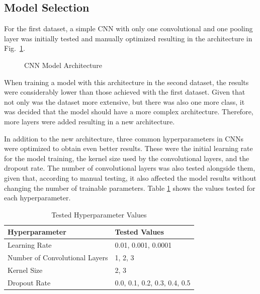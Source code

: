 \subsection{Model Selection}

For the first dataset, a simple CNN with only one convolutional and one pooling layer was initially tested and manually optimized resulting in the architecture in Fig.~\ref{fig:cnn_architecture_dataset1}.

\begin{figure}[H]
    \centering
    {\fontsize{10}{12}\selectfont}
    \caption[CNN Model Architecture]{CNN Model Architecture}
    \label{fig:cnn_architecture_dataset1}
\end{figure}

When training a model with this architecture in the second dataset, the results were considerably lower than those achieved with the first dataset. Given that not only was the dataset more extensive, but there was also one more class, it was decided that the model should have a more complex architecture. Therefore, more layers were added resulting in a new architecture.

In addition to the new architecture, three common hyperparameters in CNNs were optimized to obtain even better results. These were the initial learning rate for the model training, the kernel size used by the convolutional layers, and the dropout rate. The number of convolutional layers was also tested alongside them, given that, according to manual testing, it also affected the model results without changing the number of trainable parameters. Table \ref{table:cnn_hyperparameters} shows the values tested for each hyperparameter.

\begin{table}[H]
    \centering
    \caption{Tested Hyperparameter Values}
    \label{table:cnn_hyperparameters}
    \begin{tabular}{|l|l|}
        \hline
        Hyperparameter & Tested Values \\
        \hline
        Learning Rate & 0.01, 0.001, 0.0001 \\
        \hline
        Number of Convolutional Layers & 1, 2, 3 \\
        \hline
        Kernel Size & 2, 3 \\
        \hline
        Dropout Rate & 0.0, 0.1, 0.2, 0.3, 0.4, 0.5 \\
        \hline
    \end{tabular}
\end{table}

